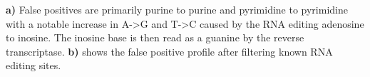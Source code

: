 \begin{table}[htb]

\begin{centering}
\caption{RNA editing as a source of false positive variant calls}\label{table:rnaediting}
\hfil
{}
\end{centering}
\begin{centering}

\par{\textbf{a)} False positives are primarily purine to purine and pyrimidine to pyrimidine with a notable increase in A->G and T->C caused by the RNA editing adenosine to inosine. The inosine base is then read as a guanine by the reverse transcriptase. \textbf{b)} shows the false positive profile after filtering known RNA editing sites.}
\end{centering}


\end{table}



